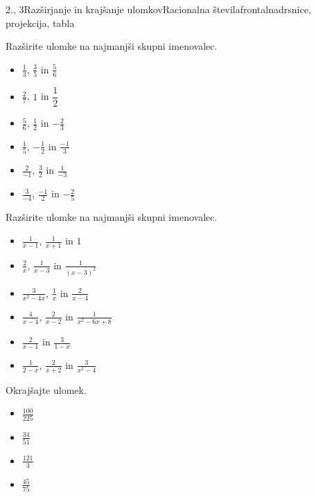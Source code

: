 \begin{priprava}{2., 3}{}{Razširjanje in krajšanje ulomkov}{Racionalna števila}{frontalna}{drsnice, projekcija, tabla}
\begin{multicols}{2}
        
            \begin{naloga}
                Razširite ulomke na najmanjši skupni imenovalec.
                \begin{itemize}
                            \item $\frac{1}{3}$, $\frac{3}{5}$ in $\frac{5}{6}$ 
                            \item $\frac{2}{7}$, $1$ in $\dfrac{1}{2}$ 
                            \item $\frac{5}{6}$, $\frac{1}{2}$ in $-\frac{2}{3}$ 
                            \item $\frac{1}{5}$, $-\frac{1}{2}$ in $\frac{-1}{3}$ 
                            \item $\frac{2}{-1}$, $\frac{3}{2}$ in $\frac{1}{-3}$ 
                            \item $\frac{3}{-4}$, $\frac{-1}{2}$ in $-\frac{2}{5}$ 
                \end{itemize}
            \end{naloga}
        

        
            \begin{naloga}
                Razširite ulomke na najmanjši skupni imenovalec.
                \begin{itemize}
                            \item $\frac{1}{x-1}$, $\frac{1}{x+1}$ in $1$ 
                            \item $\frac{2}{x}$, $\frac{1}{x-3}$ in $\frac{1}{(x-3)^2}$ 
                            \item $\frac{3}{x^2-4x}$, $\frac{1}{x}$ in $\frac{2}{x-4}$ 
                            \item $\frac{4}{x-4}$, $\frac{2}{x-2}$ in $\frac{1}{x^2-6x+8}$ 
                            \item $\frac{2}{x-1}$ in $\frac{3}{1-x}$ 
                            \item $\frac{1}{2-x}$, $\frac{2}{x+2}$ in $\frac{3}{x^2-4}$ 
                \end{itemize}
            \end{naloga}
        

        
            \begin{naloga}
                Okrajšajte ulomek.
                \begin{itemize}
                    \item $\frac{100}{225}$ 
                    \item $\frac{34}{51}$ 
                    \item $\frac{121}{3}$ 
                    \item $\frac{45}{75}$ 
                \end{itemize}
            \end{naloga}
        


\end{multicols}
\end{priprava}
